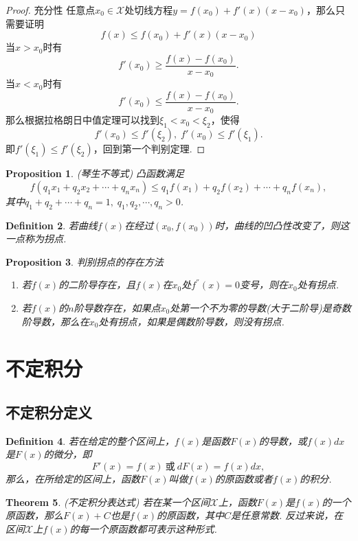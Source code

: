 \documentclass{article}
\newtheorem{theorem}{Theorem}[section]
\newtheorem{proposition}[theorem]{Proposition}
\newtheorem{definition}[theorem]{Definition}
\begin{document}
\begin{proof}
{\color{blue}充分性} 任意点$x_0 \in \mathcal{X}$处切线方程$y = f(x_0) + f'(x)(x-x_0)$，那么只需要证明
$$
f(x) \leq f(x_0) + f'(x)(x-x_0) 
$$
当$x > x_0$时有
$$
f'(x_0) \geq \frac{f(x)-f(x_0)}{x-x_0}.
$$
当$x < x_0$时有
$$
f'(x_0) \leq \frac{f(x)-f(x_0)}{x-x_0}.
$$
那么根据拉格朗日中值定理可以找到$\xi_1 <x_0 < \xi_2$，使得
$$
f'(x_0) \leq f'(\xi_2),\; f'(x_0) \leq f'(\xi_1).
$$
即$f'(\xi_1) \leq f'(\xi_2)$，回到第一个判别定理.
\end{proof}

\begin{proposition}
\rm {\color{red} (琴生不等式)} 凸函数满足 
$$
f(q_1x_1 + q_2x_2 + \cdots + q_nx_n) \leq q_1f(x_1) +q_2f(x_2) + \cdots + q_nf(x_n),
$$
其中$q_1 + q_2 + \cdots + q_n = 1,\; q_1,q_2,\cdots,q_n > 0$.
\end{proposition}

\begin{definition}
\rm 若曲线$f(x)$在经过$(x_0,f(x_0))$时，曲线的凹凸性改变了，则这一点称为{\color{red}拐点}.
\end{definition}

\begin{proposition}
\rm {\color{red}判别拐点的存在方法}
\begin{enumerate}
	\item 若$f(x)$的二阶导存在，且$f(x)$在$x_0$处$f^{''}(x)=0$变号，则在$x_0$处有拐点.
	\item 若$f(x)$的$n$阶导数存在，如果点$x_0$处第一个不为零的导数(大于二阶导)是奇数阶导数，那么在$x_0$处有拐点，如果是偶数阶导数，则没有拐点.
\end{enumerate}
\end{proposition}

\newpage
\section{不定积分}

\subsection{不定积分定义}
\begin{definition}
\rm 若在给定的整个区间上，$f(x)$是函数$F(x)$的导数，或$f(x)dx$是$F(x)$的微分，即
$$
F'(x) = f(x)~\text{或}~dF(x) = f(x)dx,
$$
那么，在所给定的区间上，函数$F(x)$叫做$f(x)$的{\color{red}原函数}或者$f(x)$的{\color{red}积分}.
\end{definition}

\begin{theorem}
\rm {\color{red} (不定积分表达式) }若在某一个区间$\mathcal{X}$上，函数$F(x)$是$f(x)$的一个原函数，那么$F(x)+C$也是$f(x)$的原函数，其中$C$是任意常数. 反过来说，在区间$\mathcal{X}$上$f(x)$的每一个原函数都可表示这种形式.
\end{theorem}
\end{document}
